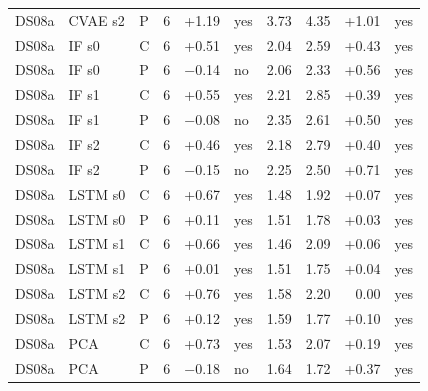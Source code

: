 \documentclass[10pt]{article}
\begin{document}
{\begin{longtable}{lllrrlrrrl}
DS08a & CVAE s2 & P & 6 & +1.19 & yes & 3.73 & 4.35 & +1.01 & yes \\
DS08a & IF s0 & C & 6 & +0.51 & yes & 2.04 & 2.59 & +0.43 & yes \\
DS08a & IF s0 & P & 6 & −0.14 & no & 2.06 & 2.33 & +0.56 & yes \\
DS08a & IF s1 & C & 6 & +0.55 & yes & 2.21 & 2.85 & +0.39 & yes \\
DS08a & IF s1 & P & 6 & −0.08 & no & 2.35 & 2.61 & +0.50 & yes \\
DS08a & IF s2 & C & 6 & +0.46 & yes & 2.18 & 2.79 & +0.40 & yes \\
DS08a & IF s2 & P & 6 & −0.15 & no & 2.25 & 2.50 & +0.71 & yes \\
DS08a & LSTM s0 & C & 6 & +0.67 & yes & 1.48 & 1.92 & +0.07 & yes \\
DS08a & LSTM s0 & P & 6 & +0.11 & yes & 1.51 & 1.78 & +0.03 & yes \\
DS08a & LSTM s1 & C & 6 & +0.66 & yes & 1.46 & 2.09 & +0.06 & yes \\
DS08a & LSTM s1 & P & 6 & +0.01 & yes & 1.51 & 1.75 & +0.04 & yes \\
DS08a & LSTM s2 & C & 6 & +0.76 & yes & 1.58 & 2.20 & 0.00 & yes \\
DS08a & LSTM s2 & P & 6 & +0.12 & yes & 1.59 & 1.77 & +0.10 & yes \\
DS08a & PCA & C & 6 & +0.73 & yes & 1.53 & 2.07 & +0.19 & yes \\
DS08a & PCA & P & 6 & −0.18 & no & 1.64 & 1.72 & +0.37 & yes \\
\end{longtable}
\vspace{-0.6em}
}
\end{document}
